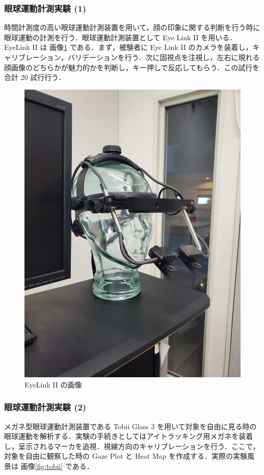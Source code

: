 \documentclass[dvipdfmx, titlepage, t]{jsarticle}
\begin{document}
    \subsubsection{眼球運動計測実験 (1)}\label{眼球}
    時間計測度の高い眼球運動計測装置を用いて，顔の印象に関する判断を行う時に眼球運動の計測を行う．眼球運動計測装置として Eye Link II を用いる．EyeLink II は 画像\ref{fig:eye_link} である．まず，被験者に Eye Link II のカメラを装着し，キャリブレーション，バリデーションを行う．次に固視点を注視し，左右に現れる顔画像のどちらかが魅力的かを判断し，キー押しで反応してもらう．この試行を合計 20 試行行う．

    \begin{figure}[H]
        \centering
        \includegraphics[keepaspectratio, width=0.6\linewidth]{figure/EyeLink.jpg}
        \caption{EyeLink II の画像}
        \label{fig:eye_link}
    \end{figure}

    \subsubsection{眼球運動計測実験 (2)}
    メガネ型眼球運動計測装置である Tobii Glass 3 を用いて対象を自由に見る時の眼球運動を解析する．実験の手続きとしてはアイトラッキング用メガネを装着し，呈示されるマーカを追視．視線方向のキャリブレーションを行う．ここで，対象を自由に観察した時の Gaze Plot と Heat Map を作成する．実際の実験風景は 画像\ref{fig:tobii} である．
\end{document}

